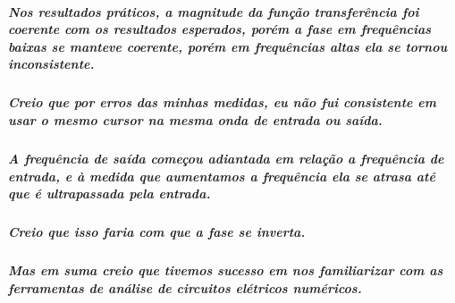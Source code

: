 \documentclass[12pt,twoside, a4paper, twocolumn]{article}
\begin{document}
\subparagraph*{Nos resultados práticos, a magnitude da função transferência foi coerente com os resultados esperados, porém a fase em frequências baixas se manteve coerente, porém em frequências altas ela se tornou inconsistente.}


\subparagraph*{Creio que por erros das minhas medidas, eu não fui consistente em usar o mesmo cursor na mesma onda de entrada ou saída.}


\subparagraph*{A frequência de saída começou adiantada em relação a frequência de entrada, e à medida que aumentamos a frequência ela se atrasa até que é ultrapassada pela entrada.}


\subparagraph*{Creio que isso faria com que a fase se inverta.}


\subparagraph*{Mas em suma creio que tivemos sucesso em nos familiarizar com as ferramentas de análise de circuitos elétricos numéricos.}
\end{document}
